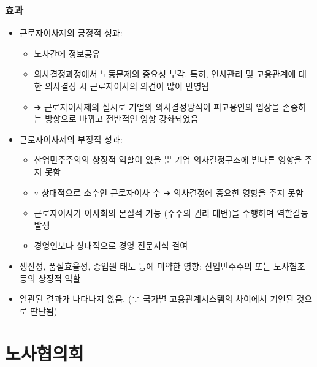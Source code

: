 \documentclass[aspectratio=169,xcolor=dvipsnames,handout]{beamer}
\begin{document}
\begin{frame}[allowframebreaks]
    \frametitle{효과}
    \begin{itemize}[<+->]
        \item 근로자이사제의 긍정적 성과:
        \begin{itemize}[<+->]
            \item 노사간에 정보공유
            \item 의사결정과정에서 노동문제의 중요성 부각. 특히, 인사관리 및 고용관계에 대한 의사결정 시 근로자이사의 의견이 많이 반영됨
            \item ➔ 근로자이사제의 실시로 기업의 의사결정방식이 피고용인의 입장을 존중하는 방향으로 바뀌고 전반적인 영향 강화되었음
        \end{itemize}
    \framebreak\relax
        \item 근로자이사제의 부정적 성과:
        \begin{itemize}[<+->]
            \item 산업민주주의의 상징적 역할이 있을 뿐 기업 의사결정구조에 별다른 영향을 주지 못함
            \item $\because$ 상대적으로 소수인 근로자이사 수 ➔ 의사결정에 중요한 영향을 주지 못함
            \item 근로자이사가 이사회의 본질적 기능 (주주의 권리 대변)을 수행하며 역할갈등 발생
            \item 경영인보다 상대적으로 경영 전문지식 결여
        \end{itemize}
    \item 생산성, 품질효율성, 종업원 태도 등에 미약한 영향: 산업민주주의 또는 노사협조 등의 상징적 역할
    \item 일관된 결과가 나타나지 않음. (∵ 국가별 고용관계시스템의 차이에서 기인된 것으로 판단됨)
    \end{itemize}
\end{frame}

\section{노사협의회}
\end{document}
